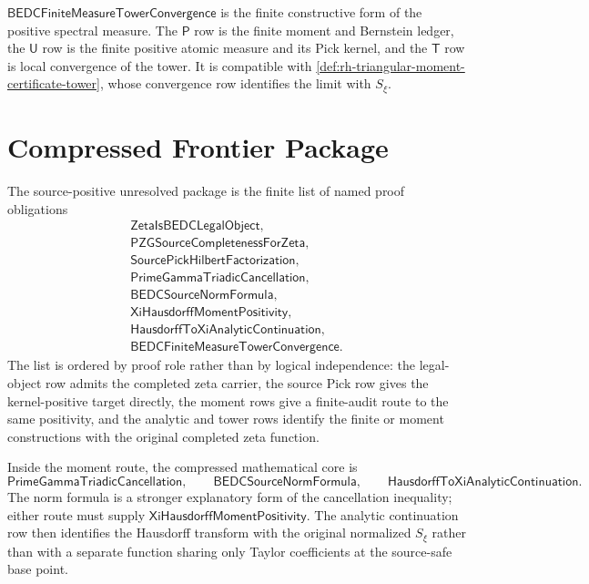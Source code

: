 \begin{principle}
\label{prin:rh-finite-measure-tower-frontier-role}
$\mathsf{BEDCFiniteMeasureTowerConvergence}$ is the finite constructive
form of the positive spectral measure. The $\mathsf P$ row is the finite
moment and Bernstein ledger, the $\mathsf U$ row is the finite positive
atomic measure and its Pick kernel, and the $\mathsf T$ row is local
convergence of the tower. It is compatible with
\autoref{def:rh-triangular-moment-certificate-tower}, whose convergence
row identifies the limit with $S_{\xi}$.
\end{principle}

\section{Compressed Frontier Package}
\label{sec:rh-source-positive-compressed-frontier}

\begin{definition}
\label{def:rh-source-positive-unresolved-package}
The source-positive unresolved package is the finite list of named
proof obligations
$$
\begin{gathered}
\mathsf{ZetaIsBEDCLegalObject},\\
\mathsf{PZGSourceCompletenessForZeta},\\
\mathsf{SourcePickHilbertFactorization},\\
\mathsf{PrimeGammaTriadicCancellation},\\
\mathsf{BEDCSourceNormFormula},\\
\mathsf{XiHausdorffMomentPositivity},\\
\mathsf{HausdorffToXiAnalyticContinuation},\\
\mathsf{BEDCFiniteMeasureTowerConvergence}.
\end{gathered}
$$
The list is ordered by proof role rather than by logical independence:
the legal-object row admits the completed zeta carrier, the source Pick
row gives the kernel-positive target directly, the moment rows give a
finite-audit route to the same positivity, and the analytic and tower
rows identify the finite or moment constructions with the original
completed zeta function.
\end{definition}

\begin{principle}
\label{prin:rh-source-positive-minimal-core}
Inside the moment route, the compressed mathematical core is
$$
\mathsf{PrimeGammaTriadicCancellation},
\qquad
\mathsf{BEDCSourceNormFormula},
\qquad
\mathsf{HausdorffToXiAnalyticContinuation}.
$$
The norm formula is a stronger explanatory form of the cancellation
inequality; either route must supply
$\mathsf{XiHausdorffMomentPositivity}$. The analytic continuation row then
identifies the Hausdorff transform with the original normalized
$S_{\xi}$ rather than with a separate function sharing only Taylor
coefficients at the source-safe base point.
\end{principle}

